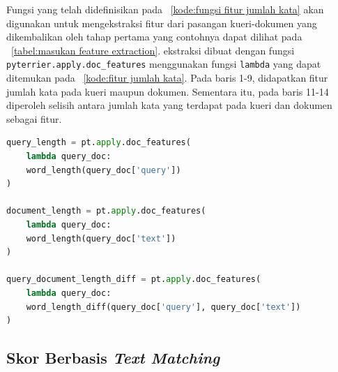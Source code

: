 Fungsi yang telah didefinisikan pada \kode{}~\ref{kode:fungsi fitur jumlah kata} akan digunakan untuk mengekstraksi fitur dari pasangan kueri-dokumen yang dikembalikan oleh tahap \ranking{} pertama yang contohnya dapat dilihat pada \tabel{}~\ref{tabel:masukan feature extraction}. \Pipeline{} ekstraksi dibuat dengan fungsi \lstinline{pyterrier.apply.doc_features} menggunakan fungsi \lstinline{lambda} yang dapat ditemukan pada \kode{}~\ref{kode:fitur jumlah kata}. Pada baris 1-9, didapatkan fitur jumlah kata pada kueri maupun dokumen. Sementara itu, pada baris 11-14 diperoleh selisih antara jumlah kata yang terdapat pada kueri dan dokumen sebagai fitur.
\begin{lstlisting}[language=Python, caption={\Pipeline{} ekstraksi fitur jumlah kata}, label={kode:fitur jumlah kata}]
query_length = pt.apply.doc_features(
    lambda query_doc:
    word_length(query_doc['query'])
)

document_length = pt.apply.doc_features(
    lambda query_doc:
    word_length(query_doc['text'])
)

query_document_length_diff = pt.apply.doc_features(
    lambda query_doc:
    word_length_diff(query_doc['query'], query_doc['text'])
)
\end{lstlisting}








\subsection{Skor Berbasis \textit{Text Matching}}
\label{subbab:4:Ekstraksi Fitur:Text Matching Score}

